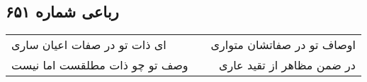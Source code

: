 \begin{center}
\section*{رباعی شماره ۶۵۱}
\label{sec:sh651}
\begin{longtable}{l p{0.5cm} r}
ای ذات تو در صفات اعیان ساری
&&
اوصاف تو در صفاتشان متواری
\\
وصف تو چو ذات مطلقست اما نیست
&&
در ضمن مظاهر از تقید عاری
\\
\end{longtable}
\end{center}
